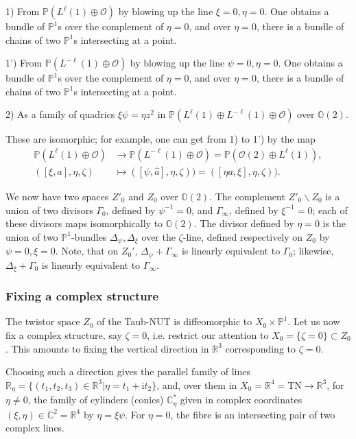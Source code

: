 \documentclass[12pt]{article}
\theoremstyle{definition}
\theoremstyle{remark}
\numberwithin{theorem}{section}
\renewcommand{\i}{\mathrm{i}}
\def\bR{{\mathbb {R}}}
\def\bC{{\mathbb {C}}}
\def\bP{{\mathbb {P}}}
\def\bO{{\mathbb {O}}}
\def\pO{{\mathcal O}}
\begin{document}
1) From $\bP(L^\ell(1)  \oplus \pO) $ by blowing up the line $\xi =0, \eta =0$. One obtains a bundle of $\bP^1$s over the complement of $\eta =0$, and over $\eta=0$, there is a bundle of chains of two $\bP^1$s intersecting at a point.
\medskip

1') From $\bP(L^{-\ell}(1)  \oplus \pO) $ by blowing up the line $\psi=0, \eta =0$. One obtains a bundle of $\bP^1$s over the complement of $\eta =0$, and over $\eta=0$, there is a bundle of chains of two $\bP^1$s intersecting at a point.
\medskip

2) As a family of quadrics $\xi \psi= \eta  z^2$ in $\bP(L^\ell(1) \oplus L^{-\ell} (1) \oplus \pO)$ over $\bO(2)$.
\medskip

These are isomorphic; for example, one can get from 1) to 1') by the map 
\begin{align} 
\bP(L^\ell(1)  \oplus \pO) &\rightarrow \bP( L^{-\ell}(1) \oplus \pO)= \bP(\pO(2) \oplus L^{\ell}(1)),\nonumber\\
 ( [\xi,a], \eta,\zeta)&\mapsto (  [ \psi, \hat a], \eta,\zeta))= ([\eta a , \xi], \eta,\zeta)).\nonumber 
 \end{align}

We now have two spaces $Z'_0$ and $ Z_0$ over $\bO(2)$. The complement $ {Z'_0}\backslash Z_0$ is a  union of two divisors $\Gamma_0$, defined by $\psi^{-1} = 0$, and $\Gamma_\infty$, defined by $\xi^{-1} = 0$; each of these divisors maps isomorphically to $\bO(2)$. The divisor defined by $\eta=0$ is the union of two $\bP^1$-bundles $\Delta_\psi, \Delta_\xi$ over the $\zeta$-line, defined respectively on $Z_0$  by $\psi = 0, \xi =0.$ Note, that on $Z_0'$, $\Delta_\psi + \Gamma_\infty$ is linearly equivalent to $\Gamma_0$; likewise, $\Delta_\xi + \Gamma_0$ is linearly equivalent to $\Gamma_\infty.$

\subsubsection{Fixing a complex structure} \label{twist}
The twistor space $Z_0$ of the Taub-NUT is diffeomorphic to $X_0\times \bP^1$.  Let us now fix a complex structure, say $\zeta = 0$, i.e. restrict our attention to $X_0 = \{\zeta= 0\} \subset Z_0$. This amounts to  fixing the vertical direction in $\bR^3$ corresponding to $\zeta=0$. 

Choosing such a direction gives the parallel family of lines $\bR_\eta=\{ (t_1,t_2,t_3)\in \bR^3| \eta= t_1+\i t_2\}$, and, over them in $X_0= \bR^4=\mathrm{TN}\rightarrow\mathbb{R}^3$, for $\eta\neq 0$, the family of cylinders (conics) $\bC^*_\eta$ given in complex coordinates $(\xi,\eta)\in \bC^2=\bR^4$ by $\eta = \xi\psi$. For $\eta = 0$, the fibre is an intersecting pair  of two complex lines.   
 
\end{document}
